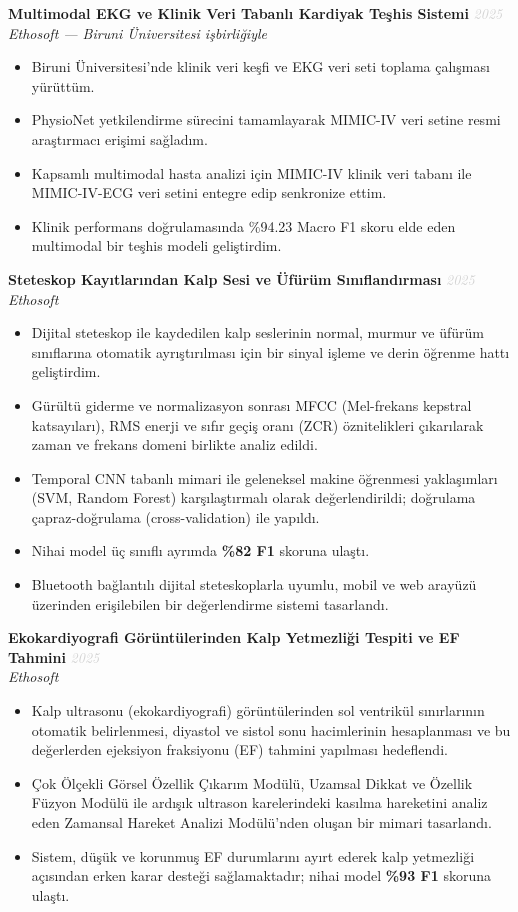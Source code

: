 \documentclass[11pt,a4paper]{article}
\newcommand{\blueitem}[1]{\textcolor{subtitleblue}{\textbf{#1}}}
\newcommand{\daterange}[1]{\hfill \textcolor{lightgray}{\textit{#1}}}
\begin{document}
\blueitem{Multimodal EKG ve Klinik Veri Tabanlı Kardiyak Teşhis Sistemi} \daterange{2025}\\
\textit{Ethosoft --- Biruni Üniversitesi işbirliğiyle}
\begin{itemize}
    \item Biruni Üniversitesi'nde klinik veri keşfi ve EKG veri seti toplama çalışması yürüttüm.
    \item PhysioNet yetkilendirme sürecini tamamlayarak MIMIC-IV veri setine resmi araştırmacı erişimi sağladım.
    \item Kapsamlı multimodal hasta analizi için MIMIC-IV klinik veri tabanı ile MIMIC-IV-ECG veri setini entegre edip senkronize ettim.
    \item Klinik performans doğrulamasında \%94.23 Macro F1 skoru elde eden multimodal bir teşhis modeli geliştirdim.
\end{itemize}

\blueitem{Steteskop Kayıtlarından Kalp Sesi ve Üfürüm Sınıflandırması} \daterange{2025}\\
\textit{Ethosoft}
\begin{itemize}
    \item Dijital steteskop ile kaydedilen kalp seslerinin normal, murmur ve üfürüm sınıflarına otomatik ayrıştırılması için bir sinyal işleme ve derin öğrenme hattı geliştirdim.
    \item Gürültü giderme ve normalizasyon sonrası MFCC (Mel-frekans kepstral katsayıları), RMS enerji ve sıfır geçiş oranı (ZCR) öznitelikleri çıkarılarak zaman ve frekans domeni birlikte analiz edildi.
    \item Temporal CNN tabanlı mimari ile geleneksel makine öğrenmesi yaklaşımları (SVM, Random Forest) karşılaştırmalı olarak değerlendirildi; doğrulama çapraz-doğrulama (cross-validation) ile yapıldı.
    \item Nihai model üç sınıflı ayrımda \textbf{\%82 F1} skoruna ulaştı.
    \item Bluetooth bağlantılı dijital steteskoplarla uyumlu, mobil ve web arayüzü üzerinden erişilebilen bir değerlendirme sistemi tasarlandı.
\end{itemize}

\blueitem{Ekokardiyografi Görüntülerinden Kalp Yetmezliği Tespiti ve EF Tahmini} \daterange{2025}\\
\textit{Ethosoft}
\begin{itemize}
    \item Kalp ultrasonu (ekokardiyografi) görüntülerinden sol ventrikül sınırlarının otomatik belirlenmesi, diyastol ve sistol sonu hacimlerinin hesaplanması ve bu değerlerden ejeksiyon fraksiyonu (EF) tahmini yapılması hedeflendi.
    \item Çok Ölçekli Görsel Özellik Çıkarım Modülü, Uzamsal Dikkat ve Özellik Füzyon Modülü ile ardışık ultrason karelerindeki kasılma hareketini analiz eden Zamansal Hareket Analizi Modülü'nden oluşan bir mimari tasarlandı.
    \item Sistem, düşük ve korunmuş EF durumlarını ayırt ederek kalp yetmezliği açısından erken karar desteği sağlamaktadır; nihai model \textbf{\%93 F1} skoruna ulaştı.
\end{itemize}
\end{document}
